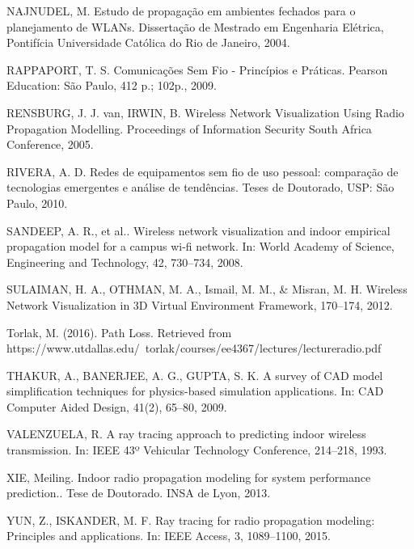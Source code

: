 \documentclass[
	12pt,				%
	openright,			%
	twoside,			%
	a4paper,			%
	english,			%
	french,				%
	spanish,			%
	brazil				%
	]{abntex2}
\begin{document}
NAJNUDEL, M. Estudo de propagação em ambientes fechados para o planejamento de WLANs. Dissertação de Mestrado em Engenharia Elétrica, Pontifícia Universidade Católica do Rio de Janeiro, 2004.

RAPPAPORT, T. S. Comunicações Sem Fio - Princípios e Práticas. Pearson Education: São Paulo, 412 p.; 102p., 2009.

RENSBURG, J. J. van, IRWIN, B. Wireless Network Visualization Using Radio Propagation Modelling. Proceedings of Information Security South Africa Conference, 2005.

RIVERA, A. D. Redes de equipamentos sem fio de uso pessoal: comparação de tecnologias emergentes e análise de tendências. Teses de Doutorado, USP: São Paulo, 2010.

SANDEEP, A. R., et al.. Wireless network visualization and indoor empirical propagation model for a campus wi-fi network. In: World Academy of Science, Engineering and Technology, 42, 730–734, 2008.

SULAIMAN, H. A., OTHMAN, M. A., Ismail, M. M., \& Misran, M. H. Wireless Network Visualization in 3D Virtual Environment Framework, 170–174, 2012.

Torlak, M. (2016). Path Loss. Retrieved from https://www.utdallas.edu/~torlak/courses/ee4367/lectures/lectureradio.pdf

THAKUR, A., BANERJEE, A. G., GUPTA, S. K. A survey of CAD model simplification techniques for physics-based simulation applications. In: CAD Computer Aided Design, 41(2), 65–80, 2009.

VALENZUELA, R. A ray tracing approach to predicting indoor wireless transmission. In: IEEE 43º Vehicular Technology Conference, 214–218, 1993.

XIE, Meiling. Indoor radio propagation modeling for system performance prediction.. Tese de Doutorado. INSA de Lyon, 2013. 

YUN, Z., ISKANDER, M. F. Ray tracing for radio propagation modeling: Principles and applications. In: IEEE Access, 3, 1089–1100, 2015.


%
%


\end{document}
